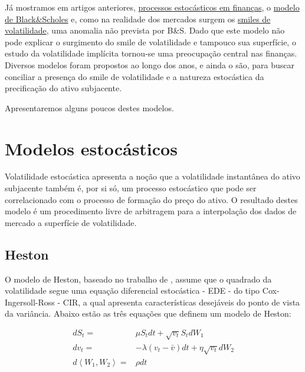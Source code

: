 \documentclass[]{book}
\theoremstyle{definition}
\theoremstyle{definition}
\theoremstyle{definition}
\theoremstyle{remark}
\begin{document}
Já mostramos em artigos anteriores, \protect\hyperlink{processos-estocasticos}{processos estocásticos em finanças}, o \protect\hyperlink{bsm}{modelo de Black\&Scholes} e, como na realidade dos mercados surgem os \protect\hyperlink{smile}{smiles de volatilidade}, uma anomalia não prevista por B\&S. Dado que este modelo não pode explicar o surgimento do smile de volatilidade e tampouco sua superfície, o estudo da volatilidade implícita tornou-se uma preocupação central nas finanças. Diversos modelos foram propostos ao longo dos anos, e ainda o são, para buscar conciliar a presença do smile de volatilidade e a natureza estocástica da precificação do ativo subjacente.

Apresentaremos alguns poucos destes modelos.

\hypertarget{modelos-estocasticos}{%
\section{Modelos estocásticos}\label{modelos-estocasticos}}

Volatilidade estocástica apresenta a noção que a volatilidade instantânea do ativo subjacente também é, por si só, um processo estocástico que pode ser correlacionado com o processo de formação do preço do ativo. O resultado destes modelo é um procedimento livre de arbitragem para a interpolação dos dados de mercado a superfície de volatilidade.

\hypertarget{heston}{%
\subsection{Heston}\label{heston}}

O modelo de Heston, baseado no trabalho de \citet{Heston1993}, assume que o quadrado da volatilidade segue uma equação diferencial estocástica - EDE - do tipo Cox-Ingersoll-Ross - CIR, a qual apresenta características desejáveis do ponto de vista da variância. Abaixo estão as três equações que definem um modelo de Heston:

\begin{equation}
\begin{aligned}
dS_t=&\mu S_t dt + \sqrt{v_t}S_t dW_1\\
dv_t=&-\lambda(v_t-\bar v)dt+\eta\sqrt{v_t}dW_2\\
d\left\langle W_1, W_2 \right\rangle=&\rho dt
\end{aligned}
\label{eq:heston}
\end{equation}
\end{document}
